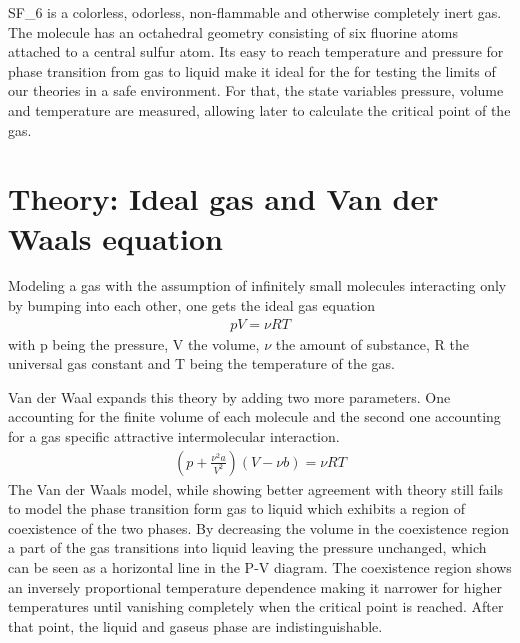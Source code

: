 \documentclass[a4paper,10pt,twocolumn]{article}
\begin{document}
    SF_6\) is a colorless, odorless, non-flammable and otherwise completely inert gas. 
    The molecule has an octahedral geometry consisting of six fluorine atoms attached to a central sulfur atom.
    Its easy to reach temperature and pressure for phase transition from gas to liquid make it ideal for the for testing the limits of our theories in a safe environment.
    For that, the state variables pressure, volume and temperature are measured, allowing later to calculate the critical point of the gas.
    \section{Theory: Ideal gas and Van der Waals equation}\label{sec:theory}
    Modeling a gas with the assumption of infinitely small molecules interacting only by bumping into each other, one gets the ideal gas equation
    \begin{align}
        pV=\nu RT
    \end{align}
    with p being the pressure, V the volume, $\nu$ the amount of substance, R the universal gas constant and T being the temperature of the gas.
    
    Van der Waal expands this theory by adding two more parameters.
    One accounting for the finite volume of each molecule and the second one accounting for a gas specific attractive intermolecular interaction.
    \begin{align}
    (p+\frac{\nu^2 a}{V^2})(V-\nu b) = \nu RT
    \end{align}
    The Van der Waals model, while showing better agreement with theory still fails to model the phase transition form gas to liquid which exhibits a region of coexistence of the two phases. 
    By decreasing the volume in the coexistence region a part of the gas transitions into liquid leaving the pressure unchanged, which can be seen as a horizontal line in the P-V diagram.
    The coexistence region shows an inversely proportional temperature dependence making it narrower for higher temperatures until vanishing completely when the critical point is reached.
    After that point, the liquid and gaseus phase are indistinguishable.
\end{document}
